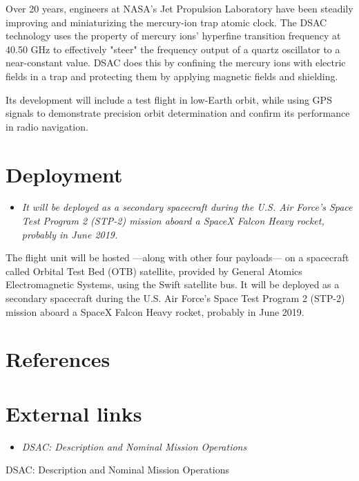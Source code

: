 Over 20 years, engineers at NASA's Jet Propulsion Laboratory have been
steadily improving and miniaturizing the mercury-ion trap atomic clock.
The DSAC technology uses the property of mercury ions' hyperfine
transition frequency at 40.50 GHz to effectively "steer" the frequency
output of a quartz oscillator to a near-constant value. DSAC does this
by confining the mercury ions with electric fields in a trap and
protecting them by applying magnetic fields and shielding.

Its development will include a test flight in low-Earth orbit, while
using GPS signals to demonstrate precision orbit determination and
confirm its performance in radio navigation.

\section{Deployment}\label{deployment}

\begin{itemize}
\item
  \emph{It will be deployed as a secondary spacecraft during the U.S.
  Air Force's Space Test Program 2 (STP-2) mission aboard a SpaceX
  Falcon Heavy rocket, probably in June 2019.}
\end{itemize}

The flight unit will be hosted ---along with other four payloads--- on a
spacecraft called Orbital Test Bed (OTB) satellite, provided by General
Atomics Electromagnetic Systems, using the Swift satellite bus. It will
be deployed as a secondary spacecraft during the U.S. Air Force's Space
Test Program 2 (STP-2) mission aboard a SpaceX Falcon Heavy rocket,
probably in June 2019.

\section{References}\label{references}

\section{External links}\label{external-links}

\begin{itemize}
\item
  \emph{DSAC: Description and Nominal Mission Operations}
\end{itemize}

DSAC: Description and Nominal Mission Operations
